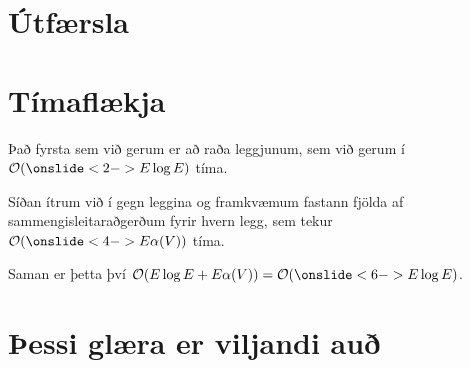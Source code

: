 \section{Útfærsla}
{
}

\section{Tímaflækja}
{
    {
        \item<1-> Það fyrsta sem við gerum er að raða leggjunum, sem við gerum í $\mathcal{O}(\onslide<2->{E \log E})$ tíma.
        \item<3-> Síðan ítrum við í gegn leggina og framkvæmum fastann fjölda af sammengisleitaraðgerðum fyrir hvern legg, sem tekur
            $\mathcal{O}(\onslide<4->{E \alpha(V)})$ tíma.
        \item<5-> Saman er þetta því $\mathcal{O}(E \log E + E \alpha(V)) = \mathcal{O}(\onslide<6->{E \log E})$.
    }
}

\section{Þessi glæra er viljandi auð}
{
}


